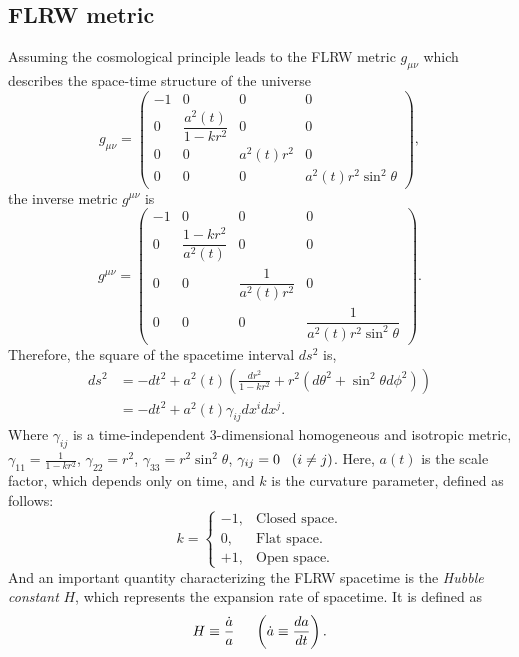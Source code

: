 \documentclass[12pt]{article}
\numberwithin{equation}{section}
\begin{document}
\subsection{FLRW metric}
Assuming the cosmological principle leads to the FLRW metric $g_{\mu\nu}$  which describes the space-time structure of the universe
\begin{equation}\label{flrw m}
    g_{\mu\nu} = \begin{pmatrix}
        -1 & 0 & 0 & 0\\
        0 & \dfrac{a^2(t)}{1 - kr^2} & 0 & 0\\
        0 & 0 & a^2(t)r^2 & 0\\
        0 & 0 & 0 & a^2(t)r^2\sin^2\theta
    \end{pmatrix},
\end{equation}
the inverse metric $g^{\mu\nu}$ is
\begin{equation}\label{flrw im}
    g^{\mu\nu} = \begin{pmatrix}
        -1 & 0 & 0 & 0\\
        0 & \dfrac{1 - kr^2}{a^2(t)} & 0 & 0\\
        0 & 0 & \dfrac{1}{a^2(t)r^2} & 0\\
        0 & 0 & 0 & \dfrac{1}{a^2(t)r^2\sin^2\theta}
    \end{pmatrix}.
\end{equation}
Therefore, the square of the spacetime interval $ds^2$ is,
\begin{align}
    ds^2 &= -dt^2 + a^2(t)\left( \frac{dr^2}{1 - kr^2} + r^2(d\theta^2 + \sin^2\theta d\phi^2) \right)\\
    &= -dt^2 + a^2(t)\gamma_{ij}dx^{i}dx^{j}.
\end{align}
Where $\gamma_{ij}$ is a time-independent 3-dimensional homogeneous and isotropic metric, $\gamma_{11} = \displaystyle \frac{1}{1 -kr^2}$, $\gamma_{22} = r^2$, $\gamma_{33} = r^2\sin^2\theta$, $\gamma_{ij} = 0 \hspace{0.3cm} (i \neq j)$. Here, $a(t)$ is the scale factor,  which depends only on time, and $k$ is the curvature parameter, defined as follows:
\begin{equation}\label{curvature parameter}
k = \begin{cases} 
-1, & \textrm{Closed space.} \\ 
0, & \textrm{Flat space.} \\ 
+1, & \textrm{Open space.} 
\end{cases}
\end{equation}
And an important quantity characterizing the FLRW spacetime is the \textit{Hubble constant} $H$, which represents the expansion rate of spacetime. It is defined as
\begin{equation}\label{Hubble const def}
    H \equiv \frac{\dot{a}}{a} \hspace{0.5cm} \left(\dot{a} \equiv \frac{da}{dt}\right).
\end{equation}
\end{document}
